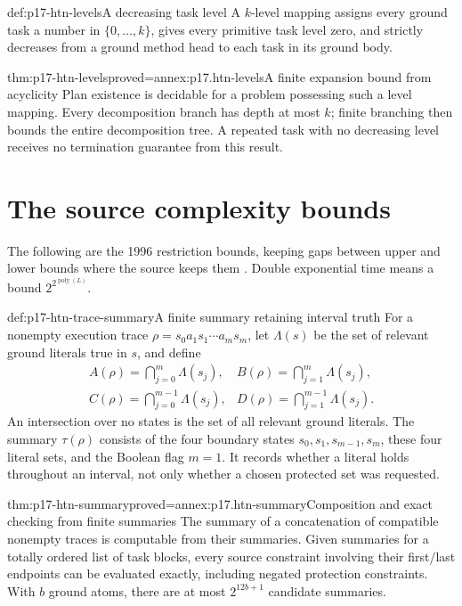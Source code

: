 \begin{hbdefinition}{def:p17-htn-levels}{A decreasing task level}
A \(k\)-level mapping assigns every ground task a number in
\(\{0,\ldots,k\}\), gives every primitive task level zero, and strictly
decreases from a ground method head to each task in its ground body.
\end{hbdefinition}

\begin{hbtheorem}{thm:p17-htn-levels}{proved=annex:p17.htn-levels}{A finite expansion bound from acyclicity}
Plan existence is decidable for a problem possessing such a level mapping.
Every decomposition branch has depth at most \(k\); finite branching then
bounds the entire decomposition tree. A repeated task with no decreasing
level receives no termination guarantee from this result.
\end{hbtheorem}

\section{The source complexity bounds}
\label{sec:p17-htn-complexity}

The following are the 1996 restriction bounds, keeping gaps between upper and
lower bounds where the source keeps them
\cite[Theorems~4--8]{ErolHendlerNau1996HTNComplexity}. Double exponential time
means a bound \(2^{2^{\operatorname{poly}(L)}}\).

\begin{hbdefinition}{def:p17-htn-trace-summary}{A finite summary retaining interval truth}
For a nonempty execution trace \(\rho=s_0a_1s_1\cdots a_ms_m\), let
\(\Lambda(s)\) be the set of relevant ground literals true in \(s\), and define
\[
 \begin{array}{ll}
 A(\rho)=\displaystyle\bigcap_{j=0}^{m}\Lambda(s_j),&
 B(\rho)=\displaystyle\bigcap_{j=1}^{m}\Lambda(s_j),\\
 C(\rho)=\displaystyle\bigcap_{j=0}^{m-1}\Lambda(s_j),&
 D(\rho)=\displaystyle\bigcap_{j=1}^{m-1}\Lambda(s_j).
 \end{array}
\]
An intersection over no states is the set of all relevant ground literals. The summary
\(\tau(\rho)\) consists of the four boundary states
\(s_0,s_1,s_{m-1},s_m\), these four literal sets, and the Boolean flag
\(m=1\). It records whether a literal holds throughout an interval, not only
whether a chosen protected set was requested.
\end{hbdefinition}

\begin{hblemma}{thm:p17-htn-summary}{proved=annex:p17.htn-summary}{Composition and exact checking from finite summaries}
The summary of a concatenation of compatible nonempty traces is computable
from their summaries. Given summaries for a totally ordered list of task
blocks, every source constraint involving their first/last endpoints can be
evaluated exactly, including negated protection constraints. With \(b\)
ground atoms, there are at most \(2^{12b+1}\) candidate summaries.
\end{hblemma}

